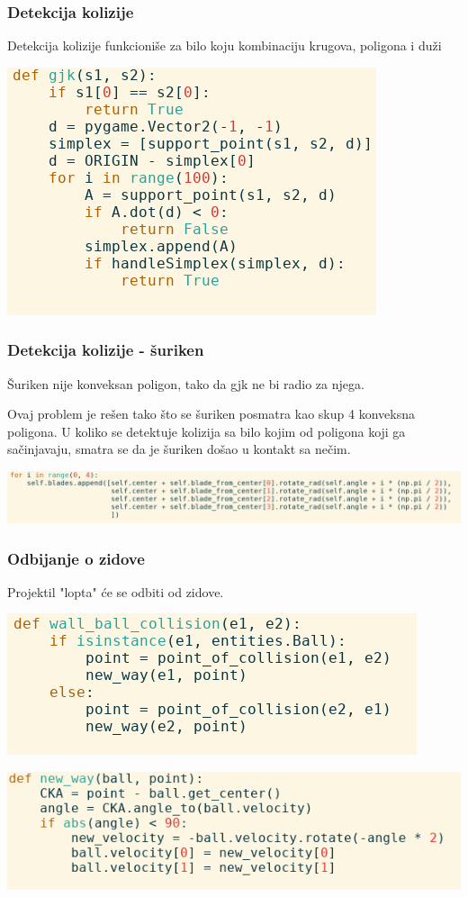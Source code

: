 \documentclass{beamer}
\begin{document}
\begin{frame}
	\frametitle{Detekcija kolizije}
	Detekcija kolizije funkcioniše za bilo koju kombinaciju krugova, poligona i duži
	\begin{center}
		\includegraphics[scale=0.5]{./images/gjk.png}
	\end{center}
\end{frame}

\begin{frame}
	\frametitle{Detekcija kolizije - šuriken}
	Šuriken nije konveksan poligon, tako da gjk ne bi radio za njega.

	Ovaj problem je rešen tako što se šuriken posmatra kao skup 4 konveksna poligona. U koliko se detektuje kolizija sa bilo kojim od poligona koji ga sačinjavaju, smatra se da je šuriken došao u kontakt sa nečim.
	
	\vspace{1cm}
	\includegraphics[scale=0.3]{./images/shurikencode.png}
\end{frame}

\begin{frame}
	\frametitle{Odbijanje o zidove}
	Projektil "lopta" će se odbiti od zidove.
	
	\vspace{1cm}
	\includegraphics[scale=0.4]{./images/ball.png}
	
	\vspace{1cm}
	\includegraphics[scale=0.4]{./images/ball1.png}
\end{frame}
\end{document}
